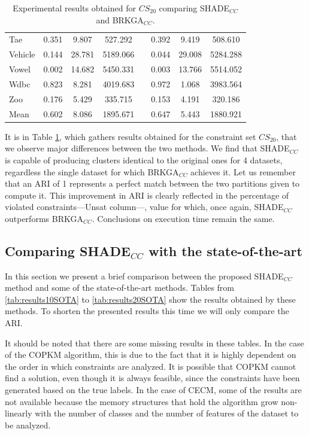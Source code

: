 \documentclass[review]{elsarticle}
\begin{document}
\begin{table}[!h]
{\begin{tabular}{l ccc c ccc}
			Tae & 0.351 & 9.807 & 527.292 && 0.392 & 9.419 & 508.610 \\
			Vehicle & 0.144 & 28.781 & 5189.066 && 0.044 & 29.008 & 5284.288 \\
			Vowel & 0.002 & 14.682 & 5450.331 && 0.003 & 13.766 & 5514.052 \\
			Wdbc & 0.823 & 8.281 & 4019.683 && 0.972 & 1.068 & 3983.564 \\
			Zoo & 0.176 & 5.429 & 335.715 && 0.153 & 4.191 & 320.186 \\
			\hline
			Mean & 0.602 & 8.086 & 1895.671 && 0.647 & 5.443 & 1880.921 \\
			\hline

		\end{tabular}}

	\caption{Experimental results obtained for $CS_{20}$ comparing SHADE$_{CC}$ and BRKGA$_{CC}$.}
	\label{tab:results20}
\end{table}

It is in Table \ref{tab:results20}, which gathers results obtained for the constraint set $CS_{20}$, that we observe major differences between the two methods. We find that SHADE$_{CC}$ is capable of producing clusters identical to the original ones for 4 datasets, regardless the single dataset for which BRKGA$_{CC}$ achieves it. Let us remember that an ARI of 1 represents a perfect match between the two partitions given to compute it. This improvement in ARI is clearly reflected in the percentage of violated constraints---Unsat column---, value for which, once again, SHADE$_{CC}$ outperforms BRKGA$_{CC}$. Conclusions on execution time remain the same.

\subsection{Comparing SHADE$_{CC}$ with the state-of-the-art} \label{sec:SHADEvsSOTA}

In this section we present a brief comparison between the proposed SHADE$_{CC}$ method and some of the state-of-the-art methods. Tables from \ref{tab:results10SOTA} to \ref{tab:results20SOTA} show the results obtained by these methods. To shorten the presented results this time we will only compare the ARI.

It should be noted that there are some missing results in these tables. In the case of the COPKM algorithm, this is due to the fact that it is highly dependent on the order in which constraints are analyzed. It is possible that COPKM cannot find a solution, even though it is always feasible, since the constraints have been generated based on the true labels. In the case of CECM, some of the results are not available because the memory structures that hold the algorithm grow non-linearly with the number of classes and the number of features of the dataset to be analyzed.
	
\end{document}
